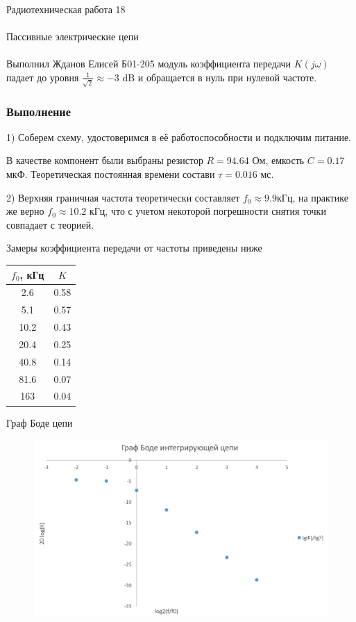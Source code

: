 \documentclass{astroedu-lab}
\begin{document}
\begin{problem}{\huge Радиотехническая работа 18\\\\Пассивные электрические цепи\\\\Выполнил Жданов Елисей Б01-205}
модуль коэффициента передачи $K(j \omega)$ падает до уровня $\frac{1}{\sqrt{2}} \approx -3$ dB и обращается в нуль при нулевой частоте.

\subsubsection{Выполнение}

1) Соберем схему, удостоверимся в её работоспособности и подключим питание.

В качестве компонент были выбраны резистор $R = 94.64$ Ом, емкость $C = 0.17$ мкФ. Теоретическая постоянная времени состави $\tau = 0.016$ мс.

2) Верхняя граничная частота теоретически составляет $f_0 \approx 9.9 кГц$, на практике же верно $f_0 \approx 10.2$ кГц, что с учетом некоторой погрешности снятия точки совпадает с теорией.

Замеры коэффициента передачи от частоты приведены ниже

\begin{center}
\begin{tabular}{|c|c|}
\hline 
$f_0$, кГц & $K$ \\
\hline
2.6  & 0.58 \\
5.1  & 0.57 \\
10.2 & 0.43 \\
20.4 & 0.25 \\ 
40.8 & 0.14 \\
81.6 & 0.07 \\
163  & 0.04 \\

\hline
\end{tabular}
\end{center}

\newpage

Граф Боде цепи

\begin{figure}[!h]
	\centering
	\includegraphics[width=1\textwidth]{1_2.png}
	\label{fig:boiler}
\end{figure}


\end{problem}
\end{document}
